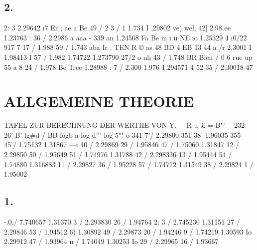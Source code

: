 \documentclass[12pt,a4paper]{article}
\begin{document}
\subsection*{2.}
2: 3 2.29642 \i{}7 Er ; ae a Be 49 / 2 3 / 1 1.734 I ,29802 ve) wel; 42] 2.98 ee 1.23763 : 36 / 2.2986 a aaa - 339 an 1.24568 Fa Be in \i{} u NE io 1.25329 4 \i{}0/22 917 7 17 / 1.988 59 / 1.743 aba Ir . TEN R \copyright{} as 48 BD 4 EB 13 44 a /r 2.3001 I 1.98413 \textdegree{} I 57 / 1.982 1.74722 1.273790 27/2 o \i{}\i{}l\i{} 43 / 1.748 BR Bien / 0 6 rue up 55 a 8 24 / 1.978 Be Tree 1.28988 : 7 / 2.300 1.976 1.294571 4 52 35 / 2.30018 47%


\newpage


\section*{ALLGEMEINE THEORIE}
TAFEL ZUR BERECHNUNG DER WERTHE VON Y.
$-$
R u \pounds{} = B"'--- 232\textdegree{} 26' B' lg\#d / BB logb a log d''' log 5"" o\textdegree{} 341\textdegree{} 7'/ 2.29800 351\textdegree{} 38' 1.96035 355\textdegree{} 45'/ 1.75132 1.31867 ---\i{} 40 / 2.29869 29 / 1.95846 47 / 1.75060 1.31847 12 / 2.29850 50 / 1.95649 51 / 1.74976 1.31788 42 / 2.298336 13 / 1.95444 54 / 1.74880 1.316883 11 / 2.29827 36 / 1.95228 57 / 1.74772 1.31549 38 / 2.29824 1 / 1.95002

\subsection*{1.}
-.0./ 7.740657 1.31370 3 /  2.293830 26 / 1.94764 2: 3 / 2.745230 1.31151 27 / 2.29846 53 / 1.94512 6) 1.30892 49 / 2.29873 20 / 1.94246 9 /  1.74219 1.30593 Io 2.29912 47 / 1.93964 \i{}\i{} / 1.74049 1.30253 Io 29 / 2.29965 16 / 1.93667
\end{document}
